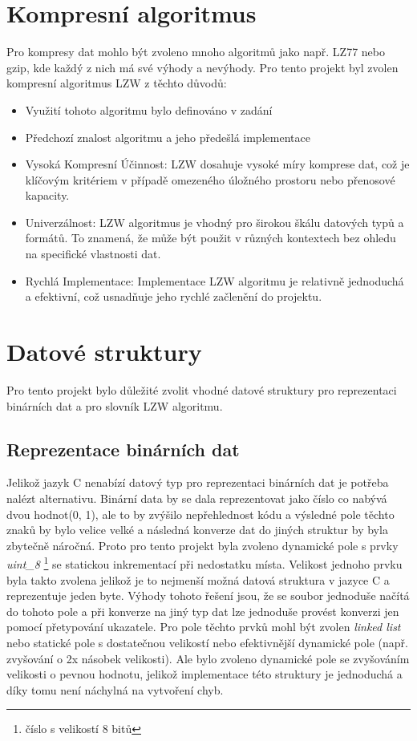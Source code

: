 \documentclass[12pt]{report}
\begin{document}
    \section{Kompresní algoritmus}
    Pro kompresy dat mohlo být zvoleno mnoho algoritmů jako např. LZ77 nebo gzip, kde každý z nich má své výhody a nevýhody. Pro tento projekt byl zvolen kompresní algoritmus LZW z těchto důvodů:
    \begin{itemize}
        \item Využití tohoto algoritmu bylo definováno v zadání
        \item Předchozí znalost algoritmu a jeho předešlá implementace
        \item Vysoká Kompresní Účinnost: LZW dosahuje vysoké míry komprese dat, což je klíčovým kritériem v případě omezeného úložného prostoru nebo přenosové kapacity.
        \item Univerzálnost: LZW algoritmus je vhodný pro širokou škálu datových typů a formátů. To znamená, že může být použit v různých kontextech bez ohledu na specifické vlastnosti dat.
        \item Rychlá Implementace: Implementace LZW algoritmu je relativně jednoduchá a efektivní, což usnadňuje jeho rychlé začlenění do projektu.
    \end{itemize}

    \section{Datové struktury}
    Pro tento projekt bylo důležité zvolit vhodné datové struktury pro reprezentaci binárních dat a pro slovník LZW algoritmu.

    \subsection{Reprezentace binárních dat}
    Jelikož jazyk C nenabízí datový typ pro reprezentaci binárních dat je potřeba nalézt alternativu. 
    Binární data by se dala reprezentovat jako číslo co nabývá dvou hodnot(0, 1), ale to by zvýšilo nepřehlednost kódu a výsledné pole těchto znaků by bylo velice velké a následná konverze dat do jiných struktur by byla zbytečně náročná. 
Proto pro tento projekt byla zvoleno dynamické pole s prvky \textit{uint_8}  \footnote{číslo s velikostí 8 bitů} se statickou inkrementací při nedostatku místa. Velikost jednoho prvku byla takto zvolena jelikož je to nejmenší možná datová struktura v jazyce C a reprezentuje jeden byte. Výhody tohoto řešení jsou, že se soubor jednoduše načítá do tohoto pole a při konverze na jiný typ dat lze jednoduše provést konverzi jen pomocí přetypování ukazatele.
    Pro pole těchto prvků mohl být zvolen \textit{linked list} nebo statické pole s dostatečnou velikostí nebo efektivnější dynamické pole (např. zvyšování o 2x násobek velikosti). Ale bylo zvoleno dynamické pole se zvyšováním velikosti o pevnou hodnotu, jelikož implementace této struktury je jednoduchá a díky tomu není náchylná na vytvoření chyb.
\end{document}
